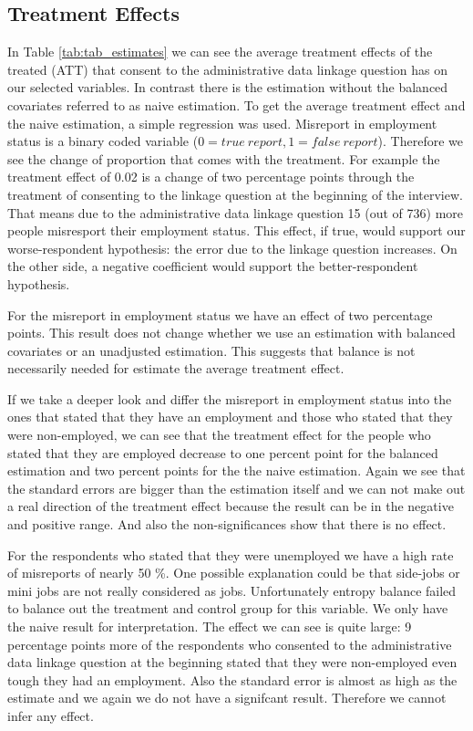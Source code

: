 

\subsection{Treatment Effects}

In Table \ref{tab:tab_estimates} we can see the average treatment effects of the treated (ATT) that consent to the administrative data linkage question has on our selected variables. In contrast there is the estimation without the balanced covariates referred to as naive estimation. To get the average treatment effect and the naive estimation, a simple regression was used. Misreport in employment status is a binary coded variable (\(0=true\ report, 1=false \ report\)). Therefore we see the change of proportion that comes with the treatment. For example the treatment effect of 0.02 is a change of two percentage points through the treatment of consenting to the linkage question at the beginning of the interview. That means due to the administrative data linkage question 15 (out of 736) more people misresport their employment status. This effect, if true, would support our worse-respondent hypothesis: the error due to the linkage question increases. On the other side, a negative coefficient would support the better-respondent hypothesis.

For the misreport in employment status we have an effect of two percentage points. This result does not change whether we use an estimation with balanced covariates or an unadjusted estimation. This suggests that balance is not necessarily needed for estimate the average treatment effect.

If we take a deeper look and differ the misreport in employment status into the ones that stated that they have an employment and those who stated that they were non-employed, we can see that the treatment effect for the people who stated that they are employed decrease to one percent point for the balanced estimation and two percent points for the the naive estimation. Again we see that the standard errors are bigger than the estimation itself and we can not make out a real direction of the treatment effect because the result can be in the negative and positive range. And also the non-significances show that there is no effect.

For the respondents who stated that they were unemployed we have a high rate of misreports of nearly 50 \%. One possible explanation could be that side-jobs or mini jobs are not really considered as jobs. Unfortunately entropy balance failed to balance out the treatment and control group for this variable. We only have the naive result for interpretation. The effect we can see is quite large: 9 percentage points more of the respondents who consented to the administrative data linkage question at the beginning stated that they were non-employed even tough they had an employment. Also the standard error is almost as high as the estimate and we again we do not have a signifcant result. Therefore we cannot infer any effect.

